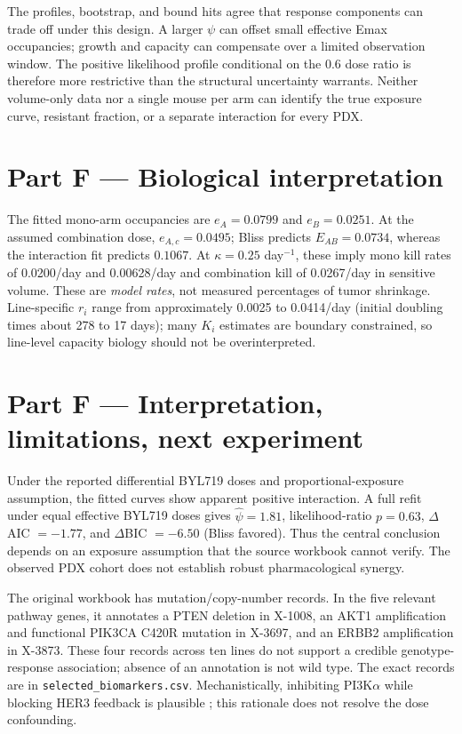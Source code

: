 \documentclass[10pt,a4paper]{article}
\begin{document}
The profiles, bootstrap, and bound hits agree that response components can trade off under this design. A larger $\psi$ can offset small effective Emax occupancies; growth and capacity can compensate over a limited observation window. The positive likelihood profile conditional on the 0.6 dose ratio is therefore more restrictive than the structural uncertainty warrants. Neither volume-only data nor a single mouse per arm can identify the true exposure curve, resistant fraction, or a separate interaction for every PDX.

\section*{Part F — Biological interpretation}
The fitted mono-arm occupancies are $e_A=0.0799$ and $e_B=0.0251$. At the assumed combination dose, $e_{A,c}=0.0495$; Bliss predicts $E_{AB}=0.0734$, whereas the interaction fit predicts $0.1067$. At $\kappa=0.25$ day$^{-1}$, these imply mono kill rates of 0.0200/day and 0.00628/day and combination kill of 0.0267/day in sensitive volume. These are \emph{model rates}, not measured percentages of tumor shrinkage. Line-specific $r_i$ range from approximately 0.0025 to 0.0414/day (initial doubling times about 278 to 17 days); many $K_i$ estimates are boundary constrained, so line-level capacity biology should not be overinterpreted.

\clearpage
\section*{Part F — Interpretation, limitations, next experiment}
Under the reported differential BYL719 doses and proportional-exposure assumption, the fitted curves show apparent positive interaction. A full refit under equal effective BYL719 doses gives $\hat\psi=1.81$, likelihood-ratio $p=0.63$, $\Delta$AIC $=-1.77$, and $\Delta$BIC $=-6.50$ (Bliss favored). Thus the central conclusion depends on an exposure assumption that the source workbook cannot verify. The observed PDX cohort does not establish robust pharmacological synergy.

The original workbook has mutation/copy-number records. In the five relevant pathway genes, it annotates a PTEN deletion in X-1008, an AKT1 amplification and functional PIK3CA C420R mutation in X-3697, and an ERBB2 amplification in X-3873. These four records across ten lines do not support a credible genotype-response association; absence of an annotation is not wild type. The exact records are in \texttt{selected\_biomarkers.csv}. Mechanistically, inhibiting PI3K$\alpha$ while blocking HER3 feedback is plausible \cite{garrett,garner}; this rationale does not resolve the dose confounding.
\end{document}
